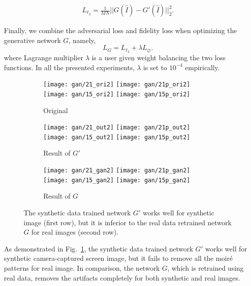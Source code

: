 \documentclass[10pt,twocolumn,letterpaper]{article}
\begin{document}
\begin{align}
  L_{\ell_2} = \frac{1}{MN}||G(\hat{I}) - G'(\hat{I})||_2^2.
\end{align}

Finally, we combine the adversarial loss and fidelity loss when
optimizing the generative network $G$, namely,
\begin{equation}
  L_G = L_{\ell_2} + \lambda L_\oslash.
  \label{eq:joint training}
\end{equation}
where Lagrange multiplier $\lambda$ is a user given weight balancing
the two loss functions.  In all the presented experiments, $\lambda$
is set to $10^{-4}$ empirically.

\begin{figure}
  \centering
  \begin{subfigure}{0.32\linewidth}
    \texttt{[image: gan/21\_ori2]}
    \texttt{[image: gan/21p\_ori2]}
    \\[1ex]
    \texttt{[image: gan/15\_ori2]}
    \texttt{[image: gan/15p\_ori2]}
    \caption{Original}
  \end{subfigure}
  \begin{subfigure}{0.32\linewidth}
    \texttt{[image: gan/21\_out2]}
    \texttt{[image: gan/21p\_out2]}
    \\[1ex]
    \texttt{[image: gan/15\_out2]}
    \texttt{[image: gan/15p\_out2]}
    \caption{Result of $G'$}
  \end{subfigure}
  \begin{subfigure}{0.32\linewidth}
    \texttt{[image: gan/21\_gan2]}
    \texttt{[image: gan/21p\_gan2]}
    \\[1ex]
    \texttt{[image: gan/15\_gan2]}
    \texttt{[image: gan/15p\_gan2]}
    \caption{Result of $G$}
  \end{subfigure}

  \caption{The synthetic data trained network $G'$ works well for
    synthetic image (first row), but it is inferior to the real data
    retrained network $G$ for real images (second row).}
  \label{fig:exp_gan}
\end{figure}

As demonstrated in Fig.~\ref{fig:exp_gan}, the synthetic data trained
network $G'$ works well for synthetic camera-captured screen image,
but it fails to remove all the moir\'e patterns for real image.  In
comparison, the network $G$, which is retrained using real data,
removes the artifacts completely for both synthetic and real images.
\end{document}
